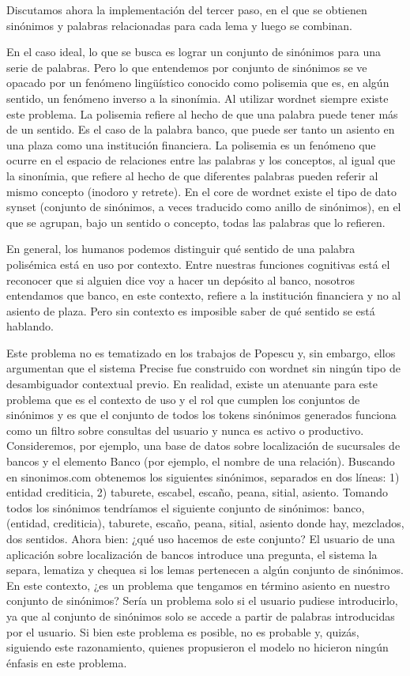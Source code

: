 Discutamos ahora la implementación del tercer paso, en el que se obtienen sinónimos y palabras relacionadas para cada lema y luego se combinan.

En el caso ideal, lo que se busca es lograr un conjunto de sinónimos para una serie de palabras. Pero lo que entendemos por conjunto de sinónimos se ve opacado por un fenómeno lingüístico conocido como polisemia que es, en algún sentido, un fenómeno inverso a la sinonímia. Al utilizar wordnet siempre existe este problema. La polisemia refiere al hecho de que una palabra puede tener más de un sentido. Es el caso de la palabra banco, que puede ser tanto un asiento en una plaza como una institución financiera. La polisemia es un fenómeno que ocurre en el espacio de relaciones entre las palabras y los conceptos, al igual que la sinonímia, que refiere al hecho de que diferentes palabras pueden referir al mismo concepto (inodoro y retrete). En el core de wordnet existe el tipo de dato synset (conjunto de sinónimos, a veces traducido como anillo de sinónimos), en el que se agrupan, bajo un sentido o concepto, todas las palabras que lo refieren.

En general, los humanos podemos distinguir qué sentido de una palabra polisémica está en uso por contexto. Entre nuestras funciones cognitivas está el reconocer que si alguien dice voy a hacer un depósito al banco, nosotros entendamos que banco, en este contexto, refiere a la institución financiera y no al asiento de plaza. Pero sin contexto es imposible saber de qué sentido se está hablando.

Este problema no es tematizado en los trabajos de Popescu y, sin embargo, ellos argumentan que el sistema Precise fue construido con wordnet sin ningún tipo de desambiguador contextual previo.
En realidad, existe un atenuante para este problema que es el contexto de uso y el rol que cumplen los conjuntos de sinónimos y es que el conjunto de todos los tokens sinónimos generados funciona como un filtro sobre consultas del usuario y nunca es activo o productivo.
Consideremos, por ejemplo, una base de datos sobre localización de sucursales de bancos y el elemento Banco (por ejemplo, el nombre de una relación).
Buscando en sinonimos.com obtenemos los siguientes sinónimos, separados en dos líneas: 1) entidad crediticia, 2) taburete, escabel, escaño, peana, sitial, asiento. Tomando todos los sinónimos tendríamos el siguiente conjunto de sinónimos: {banco, (entidad, crediticia), taburete, escaño, peana, sitial, asiento} donde hay, mezclados, dos sentidos. Ahora bien: ¿qué uso hacemos de este conjunto? El usuario de una aplicación sobre localización de bancos introduce una pregunta, el sistema la separa, lematiza y chequea si los lemas pertenecen a algún conjunto de sinónimos. En este contexto, ¿es un problema que tengamos en término asiento en nuestro conjunto de sinónimos? Sería un problema solo si el usuario pudiese introducirlo, ya que al conjunto de sinónimos solo se accede a partir de palabras introducidas por el usuario. Si bien este problema es posible, no es probable y, quizás, siguiendo este razonamiento, quienes propusieron el modelo no hicieron ningún énfasis en este problema.

